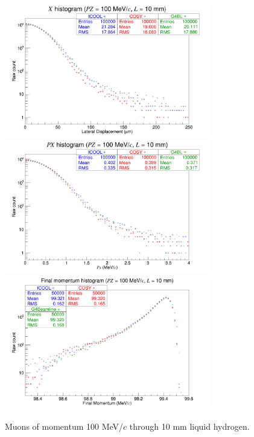 \begin{figure}[!htb]
  \centering
    \includegraphics[width=0.8\textwidth]{Validation/LH/X.100.10.png} 
    \includegraphics[width=0.8\textwidth]{Validation/LH/PX.100.10.png} 
    \includegraphics[width=0.8\textwidth]{Validation/LH/strag.100.10.png} 
  \caption{Muons of momentum 100 MeV/$c$ through 10 mm liquid hydrogen.}
  \label{fig:100.10}
\end{figure}

